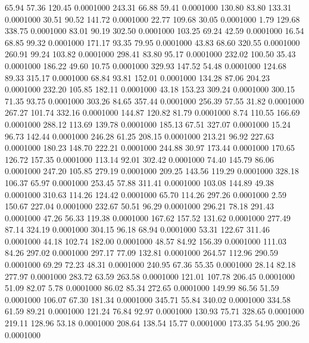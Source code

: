   65.94   57.36  120.45   0.0001000
 243.31   66.88   59.41   0.0001000
 130.80   83.80  133.31   0.0001000
  30.51   90.52  141.72   0.0001000
  22.77  109.68   30.05   0.0001000
   1.79  129.68  338.75   0.0001000
  83.01   90.19  302.50   0.0001000
 103.25   69.24   42.59   0.0001000
  16.54   68.85   99.32   0.0001000
 171.17   93.35   79.95   0.0001000
  43.83   68.60  320.55   0.0001000
 260.91   99.24  103.82   0.0001000
 298.41   83.80   95.17   0.0001000
 232.02  100.50   35.43   0.0001000
 186.22   49.60   10.75   0.0001000
 329.93  147.52   54.48   0.0001000
 124.68   89.33  315.17   0.0001000
  68.84   93.81  152.01   0.0001000
 134.28   87.06  204.23   0.0001000
 232.20  105.85  182.11   0.0001000
  43.18  153.23  309.24   0.0001000
 300.15   71.35   93.75   0.0001000
 303.26   84.65  357.44   0.0001000
 256.39   57.55   31.82   0.0001000
 267.27  101.74  332.16   0.0001000
 144.87  120.82   81.79   0.0001000
   8.74  110.55  166.69   0.0001000
 288.12  113.69  139.78   0.0001000
 185.13   67.51  327.07   0.0001000
  15.24   96.73  142.44   0.0001000
 246.28   61.25  208.15   0.0001000
 213.21   96.92  227.63   0.0001000
 180.23  148.70  222.21   0.0001000
 244.88   30.97  173.44   0.0001000
 170.65  126.72  157.35   0.0001000
 113.14   92.01  302.42   0.0001000
  74.40  145.79   86.06   0.0001000
 247.20  105.85  279.19   0.0001000
 209.25  143.56  119.29   0.0001000
 328.18  106.37   65.97   0.0001000
 253.45   57.88  311.41   0.0001000
 103.08  144.89   49.38   0.0001000
 310.63  114.26  124.42   0.0001000
  65.70  114.26  297.26   0.0001000
   2.59  150.67  227.04   0.0001000
 232.67   50.51   96.29   0.0001000
 296.21   78.18  291.43   0.0001000
  47.26   56.33  119.38   0.0001000
 167.62  157.52  131.62   0.0001000
 277.49   87.14  324.19   0.0001000
 304.15   96.18   68.94   0.0001000
  53.31  122.67  311.46   0.0001000
  44.18  102.74  182.00   0.0001000
  48.57   84.92  156.39   0.0001000
 111.03   84.26  297.02   0.0001000
 297.17   77.09  132.81   0.0001000
 264.57  112.96  290.59   0.0001000
  69.29   72.23   48.31   0.0001000
 240.95   67.36   55.35   0.0001000
  28.14   82.18  277.97   0.0001000
 283.72   63.59  263.58   0.0001000
 121.01  107.78  206.45   0.0001000
  51.09   82.07    5.78   0.0001000
  86.02   85.34  272.65   0.0001000
 149.99   86.56   51.59   0.0001000
 106.07   67.30  181.34   0.0001000
 345.71   55.84  340.02   0.0001000
 334.58   61.59   89.21   0.0001000
 121.24   76.84   92.97   0.0001000
 130.93   75.71  328.65   0.0001000
 219.11  128.96   53.18   0.0001000
 208.64  138.54   15.77   0.0001000
 173.35   54.95  200.26   0.0001000
